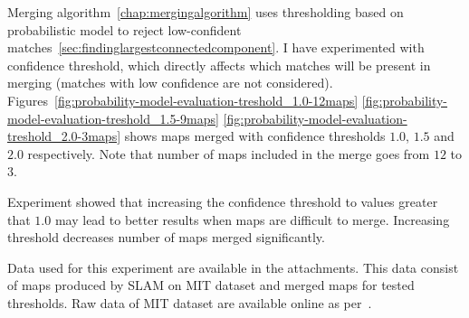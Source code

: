 Merging algorithm~\ref{chap:mergingalgorithm} uses thresholding based on probabilistic model to reject low-confident matches~\ref{sec:findinglargestconnectedcomponent}. I have experimented with confidence threshold, which directly affects which matches will be present in merging (matches with low confidence are not considered). Figures~\ref{fig:probability-model-evaluation-treshold_1.0-12maps} \ref{fig:probability-model-evaluation-treshold_1.5-9maps} \ref{fig:probability-model-evaluation-treshold_2.0-3maps} shows maps merged with confidence thresholds $1.0$, $1.5$ and $2.0$ respectively. Note that number of maps included in the merge goes from $12$ to $3$.

Experiment showed that increasing the confidence threshold to values greater that $1.0$ may lead to better results when maps are difficult to merge. Increasing threshold decreases number of maps merged significantly.

Data used for this experiment are available in the attachments. This data consist of maps produced by \gls{SLAM} on \gls{MIT} dataset and merged maps for tested thresholds. Raw data of \gls{MIT} dataset are available online as per~\cite{Fallon2013}.

